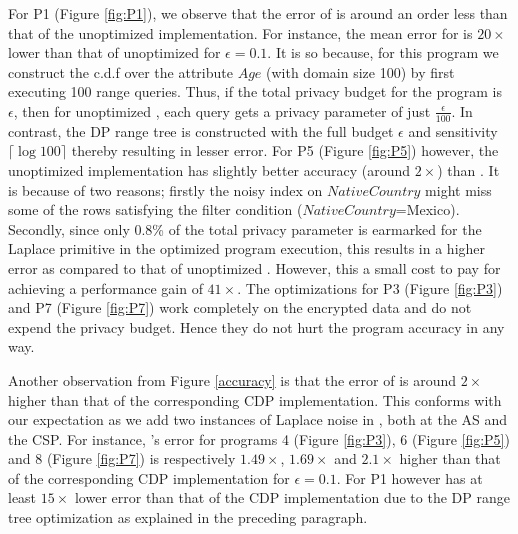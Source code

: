 For P1 (Figure \ref{fig:P1}), we observe that the error of \system is around an order less than that of the unoptimized implementation. For instance, the mean error for \system is $20\times$ lower than that of unoptimized \system for $\epsilon=0.1$.  It is so because, for this program we construct the c.d.f over the attribute $Age$ (with domain size 100) by first executing 100 range queries. %
Thus, if the total privacy budget for the program is $\epsilon$, then for unoptimized \system, each query gets a privacy parameter of just $\frac{\epsilon}{100}$. In contrast, the DP range tree is constructed with the full budget $\epsilon$ and sensitivity $\lceil\log 100\rceil$ thereby resulting in lesser error. For P5 (Figure \ref{fig:P5}) however, the unoptimized implementation has slightly better accuracy (around $2\times$) than \system. It is because of two reasons; firstly the noisy index on $NativeCountry$ might miss some of the rows satisfying the filter condition ($NativeCountry$=Mexico). Secondly, since only 0.8\% of the total privacy parameter is earmarked for the \textsf{Laplace} primitive in the optimized program execution, this results in a higher error as compared to that of unoptimized \system. However, this a small  cost to pay for achieving a performance gain of $41\times$. The optimizations for P3 (Figure \ref{fig:P3}) and P7 (Figure \ref{fig:P7}) work completely on the encrypted data and do not expend the privacy budget. Hence they do not hurt the program accuracy in any way.
 
 Another observation from Figure \ref{accuracy} is that the error of \system is around $2\times$ higher than that of the corresponding \textsf{CDP} implementation. This conforms with our expectation as we add two instances of Laplace noise in \system, both at the \textsf{AS} and the \textsf{CSP}. For instance, \system's error for programs 4 (Figure \ref{fig:P3}), 6 (Figure \ref{fig:P5}) and 8 (Figure \ref{fig:P7})  is respectively $1.49\times$, $1.69 \times$ and $2.1\times$ higher  than that of the corresponding \textsf{CDP} implementation for $\epsilon=0.1$.  For P1 however \system has at least $15\times$ lower error than that of the \textsf{CDP} implementation due to the DP range tree optimization as explained in the preceding paragraph.
 

